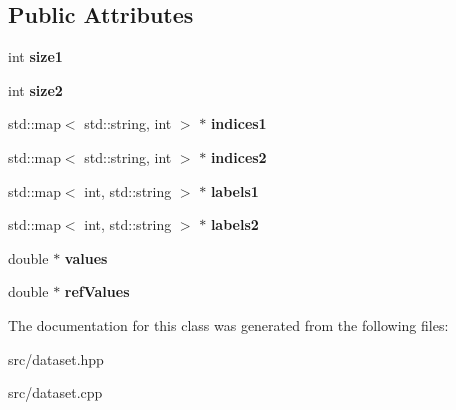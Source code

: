 \subsection*{Public Attributes}
\begin{DoxyCompactItemize}
\item 
\hypertarget{classDataset_a1cde47fee5ecc5f5f26c5ab3bb0331e3}{int {\bfseries size1}}\label{classDataset_a1cde47fee5ecc5f5f26c5ab3bb0331e3}

\item 
\hypertarget{classDataset_aaee19e6556e5168943fd128d38889a91}{int {\bfseries size2}}\label{classDataset_aaee19e6556e5168943fd128d38889a91}

\item 
\hypertarget{classDataset_ad7c03e01fa34e8986144340a6ddcf53c}{std\-::map$<$ std\-::string, int $>$ $\ast$ {\bfseries indices1}}\label{classDataset_ad7c03e01fa34e8986144340a6ddcf53c}

\item 
\hypertarget{classDataset_ade1e047d83395ee7f2241dbb25dd1455}{std\-::map$<$ std\-::string, int $>$ $\ast$ {\bfseries indices2}}\label{classDataset_ade1e047d83395ee7f2241dbb25dd1455}

\item 
\hypertarget{classDataset_a4598a42f6e129c3b073f62645a1c2893}{std\-::map$<$ int, std\-::string $>$ $\ast$ {\bfseries labels1}}\label{classDataset_a4598a42f6e129c3b073f62645a1c2893}

\item 
\hypertarget{classDataset_a01dc253aff164fb556d9d203b29a059f}{std\-::map$<$ int, std\-::string $>$ $\ast$ {\bfseries labels2}}\label{classDataset_a01dc253aff164fb556d9d203b29a059f}

\item 
\hypertarget{classDataset_a3554a3c5723716a89be372b946d04f54}{double $\ast$ {\bfseries values}}\label{classDataset_a3554a3c5723716a89be372b946d04f54}

\item 
\hypertarget{classDataset_a4a03dd925f63d0611c75223850c93569}{double $\ast$ {\bfseries ref\-Values}}\label{classDataset_a4a03dd925f63d0611c75223850c93569}

\end{DoxyCompactItemize}


The documentation for this class was generated from the following files\-:\begin{DoxyCompactItemize}
\item 
src/dataset.\-hpp\item 
src/dataset.\-cpp\end{DoxyCompactItemize}

